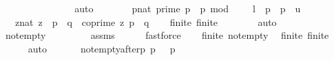 \begin{isabellebody}
\ \ \ \ \ \ \ \ {\isachardoublequoteclose}\ \isanewline
\ \ \ \ \isamarkupfalse%
\ auto\isanewline
\ \isanewline
\ \ \isamarkupfalse%
\ {\isacharquery}{\kern0pt}{\isasymK}\ {\isacharequal}{\kern0pt}\ {\isachardoublequoteopen}{\isacharbraceleft}{\kern0pt}{\isacharparenleft}{\kern0pt}p{\isacharcolon}{\kern0pt}{\isacharcolon}{\kern0pt}nat{\isacharparenright}{\kern0pt}{\isachardot}{\kern0pt}\ prime\ p\ {\isasymand}\ p\ mod\ {}\ {\isacharequal}{\kern0pt}\ {}\ {\isasymand}\ l\ {\isasymle}\ p\ {\isasymand}\ p\ {\isasymle}\ u{\isacharbraceright}{\kern0pt}{\isachardoublequoteclose}\isanewline
\ \ \isamarkupfalse%
\ {\isacharquery}{\kern0pt}{\isasymZ}\ {\isacharequal}{\kern0pt}\ {\isachardoublequoteopen}{\isacharbraceleft}{\kern0pt}{\isacharparenleft}{\kern0pt}z{\isacharcolon}{\kern0pt}{\isacharcolon}{\kern0pt}nat{\isacharparenright}{\kern0pt}{\isachardot}{\kern0pt}\ z\ {\isacharless}{\kern0pt}\ p\ {\isacharasterisk}{\kern0pt}\ q\ {\isasymand}\ coprime\ z\ {\isacharparenleft}{\kern0pt}p\ {\isacharasterisk}{\kern0pt}\ q{\isacharparenright}{\kern0pt}{\isacharbraceright}{\kern0pt}{\isachardoublequoteclose}\isanewline
\isanewline
\ \ \isamarkupfalse%
\ {\isasymK}{\isacharunderscore}{\kern0pt}finite{\isacharcolon}{\kern0pt}\ {\isachardoublequoteopen}finite\ {\isacharquery}{\kern0pt}{\isasymK}{\isachardoublequoteclose}\ \isanewline
\ \ \ \ \isamarkupfalse%
\ auto\isanewline
\ \ \isamarkupfalse%
\ {\isasymK}{\isacharunderscore}{\kern0pt}not{\isacharunderscore}{\kern0pt}empty{\isacharcolon}{\kern0pt}\ {\isachardoublequoteopen}{\isacharquery}{\kern0pt}{\isasymK}\ {\isasymnoteq}\ {\isacharbraceleft}{\kern0pt}{\isacharbraceright}{\kern0pt}{\isachardoublequoteclose}\isanewline
\ \ \ \ \isamarkupfalse%
\ assms{\isacharparenleft}{\kern0pt}{}{\isacharparenright}{\kern0pt}\isanewline
\ \ \ \ \isamarkupfalse%
\ fastforce\isanewline
\ \ \isamarkupfalse%
\ {\isasymK}{\isacharunderscore}{\kern0pt}finite\ {\isasymK}{\isacharunderscore}{\kern0pt}not{\isacharunderscore}{\kern0pt}empty\ \isamarkupfalse%
\ {\isasymK}{\isacharunderscore}{\kern0pt}finite{\isacharprime}{\kern0pt}{\isacharcolon}{\kern0pt}\ {\isachardoublequoteopen}finite{\isacharprime}{\kern0pt}\ {\isacharquery}{\kern0pt}{\isasymK}{\isachardoublequoteclose}\ \isanewline
\ \ \ \ \isamarkupfalse%
\ auto\isanewline
\ \ \isanewline
\ \ \isamarkupfalse%
\ {\isasymK}{\isacharunderscore}{\kern0pt}not{\isacharunderscore}{\kern0pt}empty{\isacharunderscore}{\kern0pt}after{\isacharunderscore}{\kern0pt}p{\isacharcolon}{\kern0pt}\ {\isachardoublequoteopen}{\isasymAnd}p{\isachardot}{\kern0pt}\ {\isacharquery}{\kern0pt}{\isasymK}\ {\isacharminus}{\kern0pt}\ {\isacharbraceleft}{\kern0pt}p{\isacharbraceright}{\kern0pt}\ {\isasymnoteq}\ {\isacharbraceleft}{\kern0pt}{\isacharbraceright}{\kern0pt}{\isachardoublequoteclose}\isanewline

\end{isabellebody}
